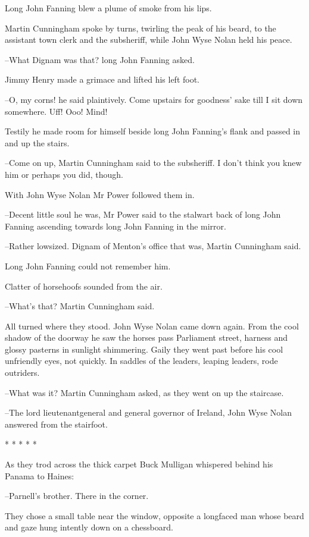 Long John Fanning blew a plume of smoke from his lips.

Martin Cunningham spoke by turns, twirling the peak of his beard, to the
assistant town clerk and the subsheriff, while John Wyse Nolan held his
peace.

--What Dignam was that? long John Fanning asked.

Jimmy Henry made a grimace and lifted his left foot.

--O, my corns! he said plaintively. Come upstairs for goodness' sake till
I sit down somewhere. Uff! Ooo! Mind!

Testily he made room for himself beside long John Fanning's flank and
passed in and up the stairs.

--Come on up, Martin Cunningham said to the subsheriff. I don't think you
knew him or perhaps you did, though.

With John Wyse Nolan Mr Power followed them in.

--Decent little soul he was, Mr Power said to the stalwart back of long
John Fanning ascending towards long John Fanning in the mirror.

--Rather lowsized. Dignam of Menton's office that was, Martin Cunningham
said.

 Long John Fanning could not remember him.

 Clatter of horsehoofs sounded from the air.

--What's that? Martin Cunningham said.

All turned where they stood. John Wyse Nolan came down again. From the
cool shadow of the doorway he saw the horses pass Parliament street,
harness and glossy pasterns in sunlight shimmering. Gaily they went past
before his cool unfriendly eyes, not quickly. In saddles of the leaders,
leaping leaders, rode outriders.

--What was it? Martin Cunningham asked, as they went on up the staircase.

--The lord lieutenantgeneral and general governor of Ireland, John Wyse
Nolan answered from the stairfoot.


    * * * * *


As they trod across the thick carpet Buck Mulligan whispered behind
his Panama to Haines:

--Parnell's brother. There in the corner.

They chose a small table near the window, opposite a longfaced man
whose beard and gaze hung intently down on a chessboard.

